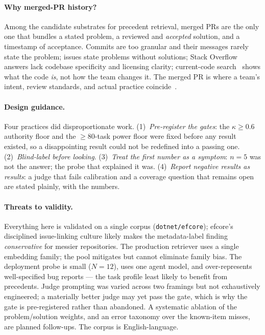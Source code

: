 \documentclass[sigconf,nonacm]{acmart}
\begin{document}
\paragraph{Why merged-PR history?}
Among the candidate substrates for precedent retrieval, merged PRs are the
only one that bundles a stated problem, a reviewed and \emph{accepted}
solution, and a timestamp of acceptance. Commits are too granular and
their messages rarely state the problem; issues state problems without
solutions; Stack Overflow answers lack codebase specificity and licensing
clarity; current-code search~\cite{husain2019codesearchnet} shows what the
code \emph{is}, not how the team changes it. The merged PR is where a
team's intent, review standards, and actual practice
coincide~\cite{gousios2014exploratory}.

\paragraph{Design guidance.}
Four practices did disproportionate work. (1)~\emph{Pre-register the
gates}: the $\kappa \ge 0.6$ authority floor and the $\ge 80$-task power
floor were fixed before any result existed, so a disappointing result
could not be redefined into a passing one. (2)~\emph{Blind-label before
looking}. (3)~\emph{Treat the first number as a symptom}: $n{=}5$ was not
the answer; the probe that explained it was. (4)~\emph{Report negative
results as results}: a judge that fails calibration and a coverage
question that remains open are stated plainly, with the numbers.

\paragraph{Threats to validity.}
Everything here is validated on a single corpus (\texttt{dotnet/efcore});
efcore's disciplined issue-linking culture likely makes the metadata-label
finding \emph{conservative} for messier repositories. The production
retriever uses a single embedding family; the pool mitigates but cannot
eliminate family bias. The deployment probe is small ($N{=}12$), uses one
agent model, and over-represents well-specified bug reports --- the task
profile least likely to benefit from precedents. Judge prompting was
varied across two framings but not exhaustively engineered; a materially
better judge may yet pass the gate, which is why the gate is
pre-registered rather than abandoned. A systematic ablation of the
problem/solution weights, and an error taxonomy over the known-item
misses, are planned follow-ups. The corpus is English-language.
\end{document}
